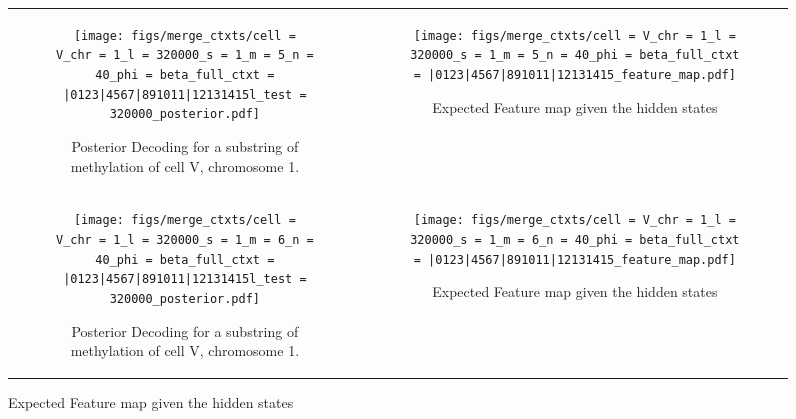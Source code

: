 \documentclass{article}
\begin{document}
\begin{figure}[H]
    \begin{tabular}{cc}
      \begin{subfigure}[t]{0.4\textwidth}
        \texttt{[image: figs/merge\_ctxts/cell = V\_chr = 1\_l = 320000\_s = 1\_m = 5\_n = 40\_phi = beta\_full\_ctxt = |0123|4567|891011|12131415l\_test = 320000\_posterior.pdf]}
        \caption{Posterior Decoding for a substring of methylation of cell V, chromosome 1.}
      \end{subfigure}
      &
      \begin{subfigure}[t]{0.6\textwidth}
        \texttt{[image: figs/merge\_ctxts/cell = V\_chr = 1\_l = 320000\_s = 1\_m = 5\_n = 40\_phi = beta\_full\_ctxt = |0123|4567|891011|12131415\_feature\_map.pdf]}
        \caption{Expected Feature map given the hidden states}
      \end{subfigure}
      \\
      \begin{subfigure}[t]{0.4\textwidth}
        \texttt{[image: figs/merge\_ctxts/cell = V\_chr = 1\_l = 320000\_s = 1\_m = 6\_n = 40\_phi = beta\_full\_ctxt = |0123|4567|891011|12131415l\_test = 320000\_posterior.pdf]}
        \caption{Posterior Decoding for a substring of methylation of cell V, chromosome 1.}
      \end{subfigure}
      &
      \begin{subfigure}[t]{0.6\textwidth}
        \texttt{[image: figs/merge\_ctxts/cell = V\_chr = 1\_l = 320000\_s = 1\_m = 6\_n = 40\_phi = beta\_full\_ctxt = |0123|4567|891011|12131415\_feature\_map.pdf]}
        \caption{Expected Feature map given the hidden states}
      \end{subfigure}
  \end{tabular}
\end{figure}
\end{document}
